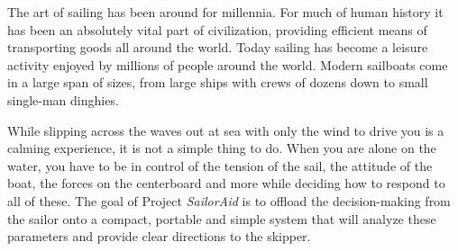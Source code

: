 
The art of sailing has been around for millennia. For much of human history it has been an absolutely vital part of civilization, providing efficient means of transporting goods all around the world. Today sailing has become a leisure activity enjoyed by millions of people around the world. Modern sailboats come in a large span of sizes, from large ships with crews of dozens down to small single-man dinghies.

While slipping across the waves out at sea with only the wind to drive you is a calming experience, it is not a simple thing to do. When you are alone on the water, you have to be in control of the tension of the sail, the attitude of the boat, the forces on the centerboard and more while deciding how to respond to all of these. The goal of Project \emph{SailorAid} is to offload the decision-making from the sailor onto a compact, portable and simple system that will analyze these parameters and provide clear directions to the \gls{skipper}. 


